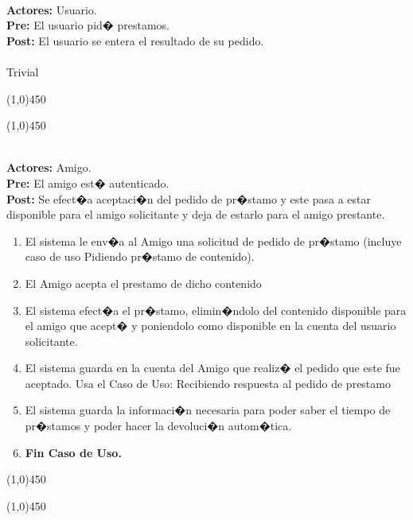 \documentclass[11pt, a4paper, spanish]{article}
\begin{document}
 \\
\textbf{Actores:} Usuario. \\
\textbf{Pre:} El usuario pid� prestamos. \\
\textbf{Post:} El usuario se entera el resultado de su pedido.\\
\\
	Trivial\\
\begin{center} \line(1,0){450} \end{center}
\newpage
\begin{center} \line(1,0){450} \end{center}

 \\
\textbf{Actores:} Amigo. \\
\textbf{Pre:} El amigo est� autenticado. \\
\textbf{Post:} Se efect�a aceptaci�n del pedido de pr�stamo y este pasa a estar disponible para el amigo solicitante y deja de estarlo para el amigo prestante.\\
\begin{enumerate}

	\item El sistema le env�a al Amigo una solicitud de pedido de pr�stamo (incluye caso de uso Pidiendo pr�stamo de contenido).
	\item El Amigo acepta el prestamo de dicho contenido
	\item El sistema efect�a el pr�stamo, elimin�ndolo del contenido disponible para el amigo que acept� y poniendolo como disponible en la cuenta del usuario solicitante.
	\item El sistema guarda en la cuenta del Amigo que realiz� el pedido que este fue aceptado. Usa el Caso de Uso: Recibiendo respuesta al pedido de prestamo
	\item El sistema guarda la informaci�n necesaria para poder saber el tiempo de pr�stamos y poder hacer la devoluci�n autom�tica.
	\item \textbf{Fin Caso de Uso.}
\end{enumerate}
\begin{center} \line(1,0){450} \end{center}
\newpage
\begin{center} \line(1,0){450} \end{center}
\end{document}

